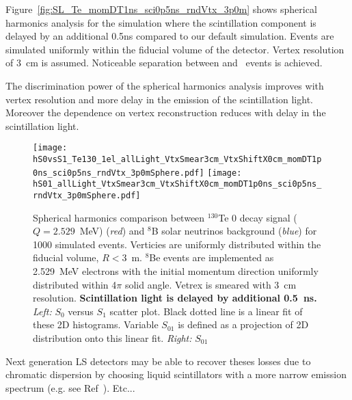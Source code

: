 Figure~\ref{fig:SL_Te_momDT1ns_sci0p5ns_rndVtx_3p0m} shows
spherical harmonics analysis for the simulation where the
scintillation component is delayed by an additional 0.5ns compared to our default simulation. Events are simulated uniformly within the fiducial volume of the detector. Vertex resolution of 3~cm is assumed. Noticeable separation between \nbb and \B~events is achieved.

The discrimination power of the spherical harmonics analysis improves with vertex resolution and more delay in the emission of the scintillation light. Moreover the dependence on vertex reconstruction reduces with delay in the scintillation light. 

\begin{figure*}[h]
  \centering
  \texttt{[image: hS0vsS1\_Te130\_1el\_allLight\_VtxSmear3cm\_VtxShiftX0cm\_momDT1p0ns\_sci0p5ns\_rndVtx\_3p0mSphere.pdf]}
  \texttt{[image: hS01\_allLight\_VtxSmear3cm\_VtxShiftX0cm\_momDT1p0ns\_sci0p5ns\_rndVtx\_3p0mSphere.pdf]}
  \caption{Spherical harmonics comparison between $^{130}$Te 0{\nbb}
    decay signal ($Q=2.529$~MeV) (\emph{red}) and $^{8}$B solar
    neutrinos background (\emph{blue}) for 1000 simulated
    events. Verticies are uniformly distributed within the fiducial
    volume, $R<3$~m. $^8$Be events are implemented as 2.529~MeV
    electrons with the initial momentum direction uniformly
    distributed within 4$\pi$ solid angle. Vetrex is smeared with 3~cm
    resolution. {\bf Scintillation light is delayed by additional
      0.5~ns.} \emph{Left:} $S_0$ versus $S_1$ scatter plot. Black dotted
    line is a linear fit of these 2D histograms. Variable $S_{01}$ is
    defined as a projection of 2D distribution onto this linear
    fit. \emph{Right:} $S_{01}$}
\label{fig:SL_Te_SmearX3cm_momDT1ns_sci0p5ns_rndVtx_3p0m}
\end{figure*}

Next generation LS detectors may be able to recover theses losses due to chromatic dispersion by choosing liquid scintillators with a more narrow emission spectrum (e.g. see Ref~\cite{LS_narrow_emission}). Etc...

